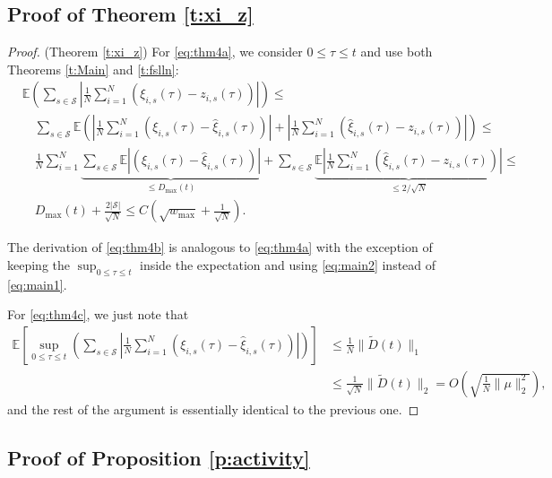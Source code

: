 \documentclass{article}
\newcommand{\E}{\mathbb{E}}
\newcommand{\1}[1]{{\mathds{1}}_{\left\{#1\right\}}}
\renewcommand{\S}{\mathcal{S}}
\begin{document}
	\subsection{Proof of Theorem  \ref{t:xi_z}}
	
	
	\begin{proof}(Theorem \ref{t:xi_z})
		For \eqref{eq:thm4a}, we consider $0\leq \tau\leq t$ and use both Theorems \ref{t:Main} and \ref{t:fslln}:
		\begin{align*}
			&\E \left(\sum_{s \in \S} \left|\frac1N\sum_{i=1}^N\left(\xi_{i,s}(\tau)-z_{i,s}(\tau)\right) \right| \right)\leq\\
			&\quad\sum_{s \in \S}\E \left(\left|\frac1N\sum_{i=1}^N\left(\xi_{i,s}(\tau)-\hat\xi_{i,s}(\tau)\right) \right| +\left|\frac1N\sum_{i=1}^N\left(\hat\xi_{i,s}(\tau)-z_{i,s}(\tau)\right) \right|\right)\leq\\
			&\quad\frac1N\sum_{i=1}^N\underbrace{\sum_{s \in \S}\E \left|\left(\xi_{i,s}(\tau)-\hat\xi_{i,s}(\tau)\right) \right|}_{\leq D_{\max}(t)} +\sum_{s \in \S}
			\underbrace{\E \left|\frac1N\sum_{i=1}^N\left(\hat\xi_{i,s}(\tau)-z_{i,s}(\tau)\right) \right|}_{\leq 2/\sqrt{N}}\leq\\
			&\quad D_{\max}(t)+\frac{2|\S|}{\sqrt{N}}\leq C\left(\sqrt{w_{\max}}+\frac{1}{\sqrt{N}}\right).
		\end{align*}
		
		The derivation of \eqref{eq:thm4b} is analogous to \eqref{eq:thm4a} with the exception of keeping the $\sup_{0 \leq \tau \leq t}$ inside the expectation and using \eqref{eq:main2} instead of \eqref{eq:main1}.
		
		For \eqref{eq:thm4c}, we just note that
		\begin{align*}
			\E\left[\sup_{0 \leq \tau \leq t}  \left(\sum_{s \in \S} \left|\frac1N\sum_{i=1}^N\left(\xi_{i,s}(\tau)-\hat\xi_{i,s}(\tau)\right) \right| \right)\right] &\leq
			\frac1N\|\tilde{D}(t)\|_1\\
			&\leq \frac1{\sqrt{N}}\| \tilde{D}(t)\|_2=O\left(\sqrt{\frac{1}{N}\|\mu \|_2^2} \right),
		\end{align*}
		and the rest of the argument is essentially identical to the previous one.
		
	\end{proof}
	
	\subsection{Proof of Proposition \ref{p:activity}}
	
\end{document}

